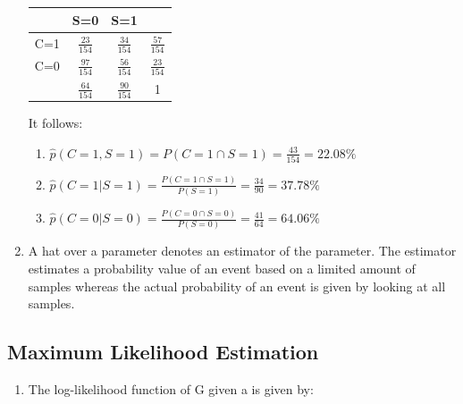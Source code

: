 \documentclass[12pt]{article}
\begin{document}
\begin{enumerate}
\begin{table}[h!]
\begin{tabular}{|c|c|c|c|}
			\bottomrule
		\end{tabular}%
	\end{table}%
	\begin{table}[h!]
		\centering
		\begin{tabular}{|c|c|c|c|}
			\toprule
			& S=0   & S=1   &  \\
			\midrule
			C=1   & $\frac{23}{154}$    & $\frac{34}{154}$    & $\frac{57}{154}$  \\
			\midrule
			C=0   & $\frac{97}{154}$    & $\frac{56}{154}$    & $\frac{23}{154}$  \\
			\midrule
			& $\frac{64}{154}$  & $\frac{90}{154}$  & 1 \\
			\bottomrule
		\end{tabular}%
	\end{table}%
	It follows:
	\begin{enumerate}[label=(\alph*)]
		\item $\hat{p}(C=1,S=1)=P(C=1\cap S=1)=\frac{43}{154}=22.08\%$
		\item $\hat{p}(C=1|S=1)=\frac{P(C=1\cap S=1)}{P(S=1)}=\frac{34}{90}=37.78\%$
		\item $\hat{p}(C=0|S=0)=\frac{P(C=0\cap S=0)}{P(S=0)}=\frac{41}{64}=64.06\%$
	\end{enumerate}
	\item A hat over a parameter denotes an estimator of the parameter. The estimator estimates a probability value of an event based on a limited amount of samples whereas the actual probability of an event is given by looking at all samples.    
\end{enumerate}

\subsection{Maximum Likelihood Estimation}

\begin{enumerate}
	\item The log-likelihood function of G given a is given by:
\end{enumerate}



%	



\end{document}
